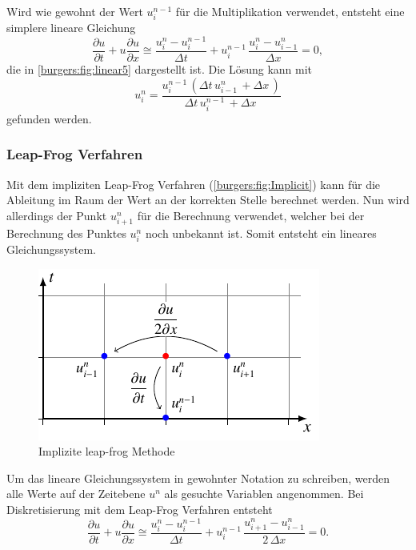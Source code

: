 		Wird wie gewohnt der Wert  $u_{i}^{n-1}$ f\"ur die Multiplikation verwendet, entsteht eine simplere lineare Gleichung
	    \begin{equation}
		\frac {\partial u}{\partial t}+u{\frac {\partial u}{\partial x}} \cong \frac{u_{i}^{n}-u_{i}^{n-1}}{\Delta t}+ u_{i}^{n-1}\, \frac{u_{i}^{n}-u_{i-1}^{n}}{\Delta x}=0,
		\label{burgers:eq:imp_lin}
		\end{equation}
		die in \autoref{burgers:fig:linear5} dargestellt ist.
	    Die L\"osung kann mit
	    \begin{equation}
		 u_{i}^{n} = \frac{u^{n-1}_{i}\, \left(\Delta{t}\, u^{n}_{i-1}\, + \Delta{x}\,\right)}{\Delta{t}\, u^{n-1}_{i}\, + \Delta{x}\,}
		 \label{burgers:eq:imp_lin_sol}
		\end{equation}
	    gefunden werden.

	\subsubsection{Leap-Frog Verfahren}

		Mit dem impliziten Leap-Frog Verfahren (\autoref{burgers:fig:Implicit}) kann f\"ur die Ableitung im Raum der Wert an der korrekten Stelle berechnet werden.
		Nun wird allerdings der Punkt  $u_{i+1}^{n}$ f\"ur die Berechnung verwendet, welcher bei der Berechnung des Punktes  $u_{i}^{n}$ noch unbekannt ist.
		Somit entsteht ein lineares Gleichungssystem.

	    \begin{figure}
		\centering
		\includegraphics[height=.4\textwidth]{papers/burgers/BurgersEquation/tikz/implicit/implicit.pdf}
		\caption{Implizite leap-frog Methode}
		\label{burgers:fig:Implicit}
	\end{figure}
	Um das lineare Gleichungssystem in gewohnter Notation zu schreiben, werden alle Werte auf der Zeitebene $u^n$ als gesuchte Variablen angenommen.
	Bei Diskretisierung mit dem Leap-Frog Verfahren entsteht
	\begin{equation}
	\frac {\partial u}{\partial t}+u{\frac {\partial u}{\partial x}} \cong \frac{u_{i}^{n}-u_{i}^{n-1}}{\Delta t}+ u_{i}^{n-1}\, \frac{u_{i+1}^{n}-u_{i-1}^{n}}{2\,\Delta x}=0.
	\end{equation}

